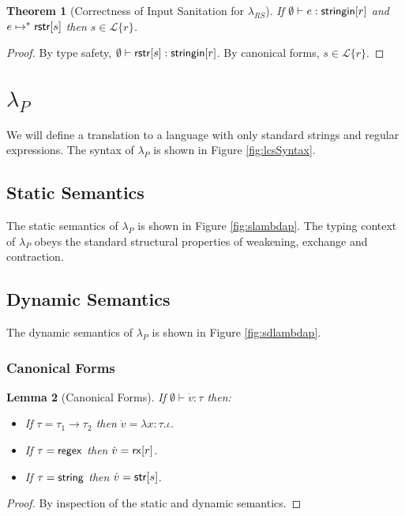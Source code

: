 \documentclass[11pt,leqno]{article}
\newtheorem{thm}{Theorem}
\newtheorem{lem}[thm]{Lemma}
\theoremstyle{definition}
\newcommand{\Lagr}{\mathcal{L}}
\newcommand{\lang}[1]{\Lagr\{#1\}}
\newcommand{\lambdas}{\lambda_{RS}}
\newcommand{\lambdap}{\lambda_P}
\newcommand{\stringin}[1]{{\sf stringin}[#1]}
\renewcommand{\tstr}[1]{{{\sf str}[#1]}}
\newcommand{\rx}[1]{ {\sf rx}[#1] }
\newcommand{\str}{{\sf string}}
\newcommand{\regex}{{\sf regex}}
\begin{document}
\begin{thm}[Correctness of Input Sanitation for $\lambdas$]\label{thm:scorrect}
  If  $\emptyset \vdash e : \stringin{r}$ and $e \mapsto^* {\sf rstr}[s]$ then $s \in \lang{r}$.
\end{thm}
\begin{proof}
By type safety, $\emptyset \vdash \rstr{s} : \stringin{r}$. By canonical forms, $s \in \lang{r}$.
\end{proof}


\section{$\lambdap$}
We will define a translation to a language with only standard strings and regular expressions. The syntax of $\lambdap$ is shown in Figure \ref{fig:lcsSyntax}.


\subsection{Static Semantics}
The static semantics of $\lambdap$ is shown in Figure \ref{fig:slambdap}. The typing context of $\lambdap$ obeys the standard structural properties of weakening, exchange and contraction.

\subsection{Dynamic Semantics}
The dynamic semantics of $\lambdap$ is shown in Figure \ref{fig:sdlambdap}.

\subsubsection{Canonical Forms}
\begin{lem}[Canonical Forms]
If $\emptyset \vdash \dot{v} : \tau$ then:
\begin{itemize}
\item If $\tau=\tau_1 \rightarrow \tau_2$ then $\dot{v}=\lambda x : \tau.\iota$.
\item If $\tau = \regex$ then $\dot{v}=\rx{r}$.
\item If $\tau = \str$ then $\dot{v}=\tstr{s}$.
\end{itemize}
\end{lem}
\begin{proof} By inspection of the static and dynamic semantics. \end{proof}
\end{document}
